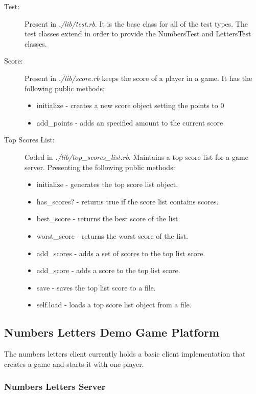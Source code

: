 \documentclass[a4paper,10pt,titlepage]{article}
\begin{document}
\begin{description}
	\item[Test:] Present in \textit{./lib/test.rb}. It is the base class for all of the test types. The test classes extend in order to provide the NumbersTest and LettersTest classes. 
	\item[Score:] Present in \textit{./lib/score.rb} keeps the score of a player in a game. It has the following public methods:
	\begin{itemize}
		\item initialize - creates a new score object setting the points to 0
		\item add\_points - adds an specified amount to the current score
	\end{itemize}

	\item[Top Scores List:] Coded in \textit{./lib/top\_scores\_list.rb}. Maintains a top score list for a game server. Presenting the following public methods:
	\begin{itemize}
		\item initialize - generates the top score list object.
		\item has\_scores? - returns true if the score list contains scores.
		\item best\_score - returns the best score of the list.
		\item worst\_score - returns the worst score of the list.
		\item add\_scores - adds a set of scores to the top list score.
		\item add\_score - adds a score to the top list score.
		\item save - saves the top list score to a file.
		\item self.load - loads a top score list object from a file.
	\end{itemize}
	
\end{description}	
		
\subsection{Numbers Letters Demo Game Platform}

\par The numbers letters client currently holds a basic client implementation that creates a game and starts it with one player.

\subsubsection{Numbers Letters Server}
\end{document}
